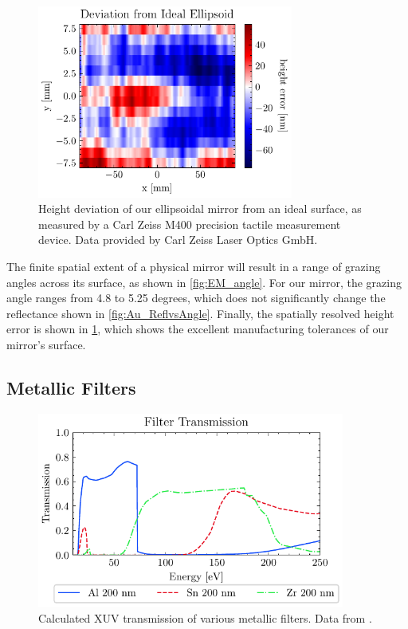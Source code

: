\begin{figure}
	\centering
	\includegraphics[width=0.75\textwidth]{figures/chap2/EM_error.pdf}
	\caption{Height deviation of our ellipsoidal mirror from an ideal surface, as measured by a Carl Zeiss M400 precision tactile measurement device. Data provided by Carl Zeiss Laser Optics GmbH.}
	\label{fig:EM_error}
\end{figure}

The finite spatial extent of a physical mirror will result in a range of grazing angles across its surface, as shown in \cref{fig:EM_angle}. For our mirror, the grazing angle ranges from 4.8 to 5.25 degrees, which does not significantly change the reflectance shown in \cref{fig:Au_ReflvsAngle}. Finally, the spatially resolved height error is shown in \cref{fig:EM_error}, which shows the excellent manufacturing tolerances of our mirror's surface.

\subsection{Metallic Filters}

\begin{figure}
	\centering
	\includegraphics[width=0.9\textwidth]{figures/chap2/Filter_transmission_CXRO.pdf}
	\caption{Calculated XUV transmission of various metallic filters. Data from \cite{gulliksonCXROXRayInteractions}.}
	\label{fig:Filter_transmission_CXRO}
\end{figure}

